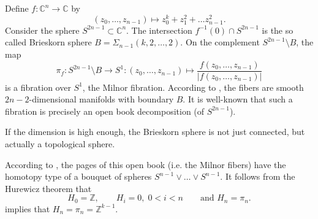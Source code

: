 Define $f\colon \mathbb C^n \to \mathbb C$ by
\[
    (z_0, \dots, z_{n-1}) \mapsto z_0^k + z_1^2 + \dots z_{n-1}^2.  
\]
Consider the sphere $S^{2n-1} \subset \mathbb C^n$.
The intersection $f^{-1}(0) \cap S^{2n-1}$ is the so called Brieskorn sphere $B = \Sigma_{n-1}(k,2,\dots,2)$.
On the complement $S^{2n-1} \setminus B$, the map
\[
    \pi_f\colon S^{2n-1}\setminus B \to S^1\colon (z_0, \dots, z_{n-1}) \mapsto \frac{f(z_0, \dots, z_{n-1})}{|f(z_0, \dots, z_{n-1})|}
\]
is a fibration over $S^1$, the Milnor fibration.
According to \cite[Lemma 6.1]{Milnor69}, the fibers are smooth $2n-2$-dimensional manifolds with boundary $B$.
It is well-known that such a fibration is precisely an open book decomposition (of $S^{2n-1}$).

If the dimension is high enough, the Brieskorn sphere is not just connected, but actually a topological sphere.

According to \cite[Thm 6.5]{Milnor69}, the pages of this open book (i.e. the Milnor fibers) have the homotopy type of a bouquet of spheres 
$S^{n-1} \vee \dots \vee S^{n-1}$.
It follows from the Hurewicz theorem that 
\[
    H_0 = \mathbb Z, \qquad H_i = 0, \; 0 < i < n \qquad \text{and } H_n = \pi_n.
\]
\cite[Theorem 9.1]{Milnor69} implies that $H_n = \pi_n = \mathbb Z^{k-1}$.

